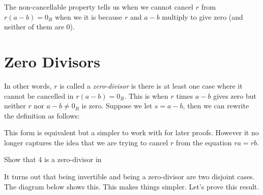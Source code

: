 The non-cancellable property tells us when we cannot cancel $r$ from $r(a-b) = 0_R$ when we 
it is because $r$ and $a-b$ multiply to give zero (and neither of them are 0). 






\section{Zero Divisors}




In other words, $r$ is called a \textit{zero-divisor} is there is at least one case 
where it cannot be cancelled in $r(a-b) = 0_R$. This is when $r$ times $a-b$ gives zero but neither $r$ nor 
$a-b \neq 0_R$ is zero. Suppose we let $s = a - b$, then we can rewrite the definition as follows: 


This form is equivalent but a simpler to work with for later proofs. However it no longer captures the 
idea that we are trying to cancel $r$ from the equation $ra = rb$.

\begin{example}
Show that 4 is a zero-divisor in 
\end{example}




It turns out that being invertible and being a zero-divisor are two disjoint cases.
 The diagram below shows this. This makes things simpler. Let's prove this result. 


\begin{figure}[h]
\end{figure}



